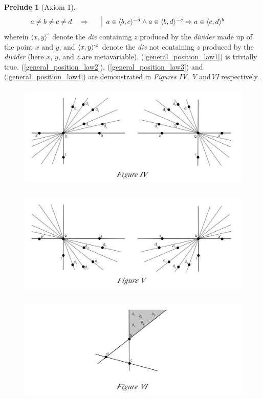 \documentclass[11pt, oneside]{article}      %
\theoremstyle{definition}
\numberwithin{equation}{section}
\newcommand{\reff}[1]{(\ref{#1})}
\theoremstyle{c}
\newtheorem*{prelude}{Prelude}
\begin{document}
\begin{prelude}[Axiom 1]
\begin{alignat}{2}
      \label{general_position_law4}
  &a\not=b\not=c\not=d \quad \Rightarrow & \quad & \begin{aligned}[t] \renewcommand\arraystretch{1.25}\begin{array}[t]{|@{\hskip0.6em}l} \color{black}
  a \in \langle b,c \rangle^{-d} \land a \in \langle b,d \rangle^{-c} \Rightarrow a \in \langle c,d \rangle^{b}
  \end{array}
  \end{aligned}\end{alignat}
wherein $\langle x,y \rangle^z$ denote the \textit{div} containing $z$ produced by the \textit{divider} made up of the point $x$ and $y$, and $\langle x,y \rangle^{\scalebox{0.75}[1.0]{-}z}$ denote the \textit{div} not containing $z$ produced by the \textit{divider} (here $x$, $y$, and $z$ are metavariable). \reff{general_position_law1} is trivially true. \reff{general_position_law2}, \reff{general_position_law3} and \reff{general_position_law4} are demonstrated in \textit{Figures IV}, \textit{V} and\textit{VI} respectively.


\begin{figure}[p]
\centering
\includegraphics[height=5cm]{figure_4.jpg}
\end{figure}
\begin{figure}[p]
\centering
 \includegraphics[height=5cm]{figure_5.jpg}
\end{figure}
\begin{figure}[p]
\centering
\includegraphics[height=5cm]{figure_6.jpg}
\end{figure}



\end{prelude}
\end{document}
